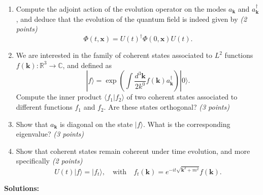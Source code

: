 \begin{enumerate}
    \item Compute the adjoint action of the evolution operator on the modes $a_{\mathbf{k}}$ and $a^\dagger_{\mathbf{k}}$, and deduce that the evolution of the quantum field is indeed given by \textit{(2 points)}
    \begin{equation}
        \Phi(t, \mathbf{x}) = U(t)^\dagger \Phi(0, \mathbf{x}) U(t).
    \end{equation}

    \item We are interested in the family of coherent states associated to $L^2$ functions $f(\mathbf{k}) : \mathbb{R}^3 \to \mathbb{C}$, and defined as
    \begin{equation}
        |f\rangle = \exp \left( \int \frac{d^3\mathbf{k}}{2k^0} f(\mathbf{k})a^\dagger_{\mathbf{k}} \right) |0\rangle.
    \end{equation}
    Compute the inner product $\langle f_1 | f_2 \rangle$ of two coherent states associated to different functions $f_1$ and $f_2$. Are these states orthogonal? \textit{(3 points)}

    \item Show that $a_{\mathbf{k}}$ is diagonal on the state $|f\rangle$. What is the corresponding eigenvalue? \textit{(3 points)}

    \item Show that coherent states remain coherent under time evolution, and more specifically \textit{(2 points)}
    \begin{equation}
        U(t)|f\rangle = |f_t\rangle, \quad \text{with} \quad f_t(\mathbf{k}) = e^{-it\sqrt{\mathbf{k}^2+m^2}} f(\mathbf{k}).
    \end{equation}
\end{enumerate}

\textbf{Solutions:}

